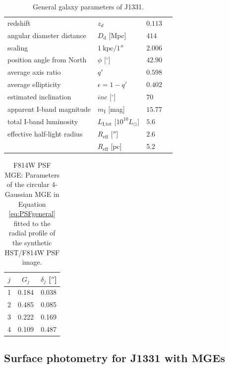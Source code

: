 \documentclass[useAMS,usenatbib]{mnras}
\begin{document}
\begin{table}
\centering
\caption{General galaxy parameters of J1331.}
\begin{tabular}{lllr}
\hline
redshift \citep{SWELLSIII}                 & $z_d$ & $0.113$ \\
angular diameter distance & $D_\text{d}$ [Mpc] & $414$ \\
scaling                   & $1~\text{kpc} / 1''$ & $2.006$ \\
position angle from North          & $\phi$ [$^\circ$] & $42.90$\\
average axis ratio & $q'$ & $0.598$\\
average ellipticity & $\epsilon = 1 - q'$ & $0.402$ \\
estimated inclination & $inc$ [$^\circ$] & $70$\\
apparent I-band magnitude & $m_\text{I}$ [mag] & $15.77$ \\
total I-band luminosity & $L_\text{I,tot}$ [$10^{10} L_\odot$] & $5.6$ \\
effective half-light radius & $R_\text{eff}$ [$''$] & $2.6$ \\
& $R_\text{eff}$ [pc]& 5.2 & \\
\hline
\end{tabular}
\label{tab:galaxyparameters}
\end{table}

\begin{table}
\centering
\caption{F814W PSF MGE: Parameters of the circular 4-Gaussian MGE in Equation \eqref{eq:PSFgeneral} fitted to the radial profile of the synthetic HST/F814W PSF image.}
\begin{tabular}{ccc}
\hline
$j$ & $G_j$ & $\delta_j$ [$''$] \\\hline
1 & 0.184 & 0.038\\
2 & 0.485 & 0.085\\
3 & 0.222 & 0.169\\
4 & 0.109 & 0.487\\\hline
\end{tabular}
\label{tab:PSFMGEF814W}
\end{table}

\subsection{Surface photometry for J1331 with MGEs} \label{sec:MGE_results}
\end{document}
